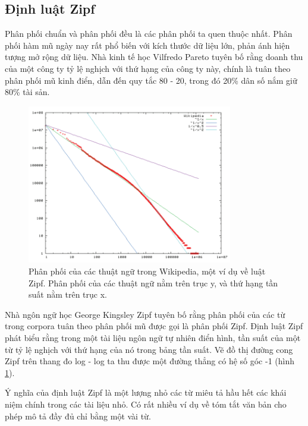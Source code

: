 \documentclass[14pt, a4paper]{article}
\numberwithin{equation}{section}
\numberwithin{figure}{section}
\numberwithin{dl}{section}
\numberwithin{md}{section}
\numberwithin{bd}{section}
\numberwithin{dn}{section}
\numberwithin{hq}{section}
\begin{document}
    \subsection{Định luật Zipf}

    Phân phối chuẩn và phân phối đều là các phân phối ta quen thuộc nhất.
    Phân phối hàm mũ ngày nay rất phổ biến với kích thước dữ liệu lớn, phản ánh hiện tượng mở rộng dữ liệu.
    Nhà kinh tế học Vilfredo Pareto tuyên bố rằng doanh thu của một công ty tỷ lệ nghịch với thứ hạng của công ty này, chính là tuân theo phân phối mũ kinh điển,
    dẫn đến quy tắc 80 - 20, trong đó 20\% dân số nắm giữ 80\% tài sản.

    \begin{figure}[h!]
        \centering
        \includegraphics[width=0.8\textwidth]{2.png}
        \caption{Phân phối của các thuật ngữ trong Wikipedia, một ví dụ về luật Zipf.
        Phân phối của các thuật ngữ nằm trên trục y, và thứ hạng tần suất nằm trên trục x.}
        \label{fig:2}
    \end{figure}

    Nhà ngôn ngữ học George Kingsley Zipf tuyên bố rằng phân phối của các từ trong corpora tuân theo phân phối mũ được gọi là phân phối Zipf.
    Định luật Zipf \cite{490} phát biểu rằng trong một tài liệu ngôn ngữ tự nhiên điển hình, tần suất của một từ tỷ lệ nghịch với thứ hạng của nó trong bảng tần suất.
    Vẽ đồ thị đường cong Zipf trên thang đo log - log ta thu được một đường thẳng có hệ số góc -1 (hình \ref{fig:2}).

    Ý nghĩa của định luật Zipf là một lượng nhỏ các từ miêu tả hầu hết các khái niệm chính trong các tài liệu nhỏ.
    Có rất nhiều ví dụ về tóm tắt văn bản cho phép mô tả đầy đủ chỉ bằng một vài từ.
\end{document}
